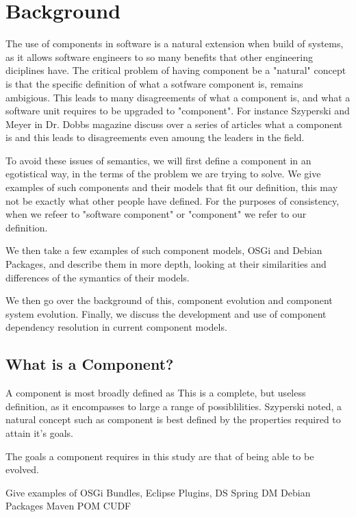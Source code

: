 \chapter{Background}
\label{background}
{}The use of components in software is a natural extension when build of systems, as it allows software engineers to so many benefits that other engineering diciplines have.
{}The critical problem of having component be a "natural" concept is that the specific definition of what a sotfware component is, remains ambigious.
This leads to many disagreements of what a component is, and what a software unit requires to be upgraded to "component".
For instance Szyperski and Meyer in Dr. Dobbs magazine discuss over a series of articles what a component is and this leads to disagreements even amoung the leaders in the field. %

{}To avoid these issues of semantics, we will first define a component in an egotistical way, in the terms of the problem we are trying to solve.
We give examples of such components and their models that fit our definition, this may not be exactly what other people have defined.
For the purposes of consistency, when we refeer to "software component" or "component" we refer to our definition.

We then take a few examples of such component models, OSGi and Debian Packages, and describe them in more depth, looking at their similarities and differences of the symantics of their models.

We then go over the background of this, component evolution and component system evolution.
Finally, we discuss the development and use of component dependency resolution in current component models.

\section{What is a Component?}

A component is most broadly defined as
This is a complete, but useless definition, as it encompasses to large a range of possiblilities. 
Szyperski noted, a natural concept such as component is best defined by the properties required to attain it's goals. %

The goals a component requires in this study are that of being able to be evolved.

Give examples of OSGi Bundles, Eclipse Plugins, DS
Spring DM
Debian Packages
Maven POM
CUDF

